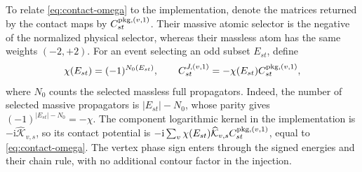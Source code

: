 \documentclass[11pt,a4paper]{article}
\numberwithin{table}{section}
\newcommand{\ii}{\mathrm i}
\begin{document}
To relate \eqref{eq:contact-omega} to the implementation, denote the matrices returned by the
contact maps by $C^{{\rm pkg},(v,1)}_{st}$. Their massive atomic selector is the negative of
the normalized physical selector, whereas their massless atom has the same weights $(-2,+2)$.
For an event selecting an odd subset $E_{st}$, define
\begin{equation}
  \chi(E_{st})=(-1)^{N_0(E_{st})},\qquad
  C^{J,(v,1)}_{st}=-\chi(E_{st})C^{{\rm pkg},(v,1)}_{st},
  \label{eq:contact-phase}
\end{equation}
where $N_0$ counts the selected massless full propagators. Indeed, the number of selected
massive propagators is $|E_{st}|-N_0$, whose parity gives $(-1)^{|E_{st}|-N_0}=-\chi$.
The component logarithmic kernel in the implementation is $-\ii\widehat{\mathcal K}_{v,s}$,
so its contact potential is $-\ii\sum_v\chi(E_{st})\widehat{\mathcal K}_{v,s}
C^{{\rm pkg},(v,1)}_{st}$, equal to \eqref{eq:contact-omega}. The vertex phase sign enters
through the signed energies and their chain rule, with no additional contour factor in the injection.
\end{document}
